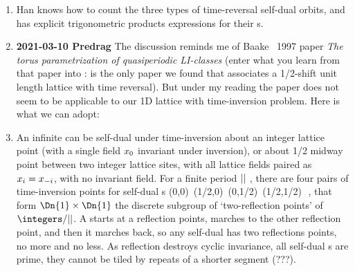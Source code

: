 \begin{enumerate}
\begin{enumerate}
    \item
Han knows how to count the three types of time-reversal self-dual orbits,
and has explicit trigonometric products expressions for their {\HillDet}s.
    \item {\bf 2021-03-10 Predrag}
The discussion reminds me of Baake \etal\ 1997 paper {\em
The torus para\-metri\-za\-tion of quasiperiodic {LI}-classes}
  (enter what you learn from that paper into
: is the only paper we found that associates a
1/2-shift unit length lattice with time reversal). But under my reading
the paper does not seem to be applicable to our 1D lattice with
time-inversion problem. Here is what we can adopt:
    \item
An infinite {\lattstate} can be self-dual under time-inversion about
an integer lattice point (with a single field $x_0$ invariant under inversion),
or about 1/2 midway point between two integer lattice sites, with all
lattice fields paired as $x_i=x_{-i}$, with no invariant field.
For a finite period ${||}$ {\lattstate}, there are four pairs of
time-inversion points for self-dual {\lattstate}s
\beq
(0,0)\,\; ({1}/{2},0)\,\;  (0,{1}/{2})\,\;  ({1}/{2},{1}/{2})\,\;
\,,
that form $\Dn{1}\times\Dn{1}$ the discrete subgroup of ‘two-reflection
points’ of $\integers/\cl{}$. A {\lattstate} starts at a
reflection points, marches to the other reflection point, and then it
marches back, so any self-dual {\lattstate} has two reflections points,
no more and no less.
As reflection destroys cyclic invariance, all self-dual {\lattstate}s
are prime, they cannot be tiled by repeats of a shorter segment
{\color{red}(???)}.


\end{enumerate}
\end{enumerate}
